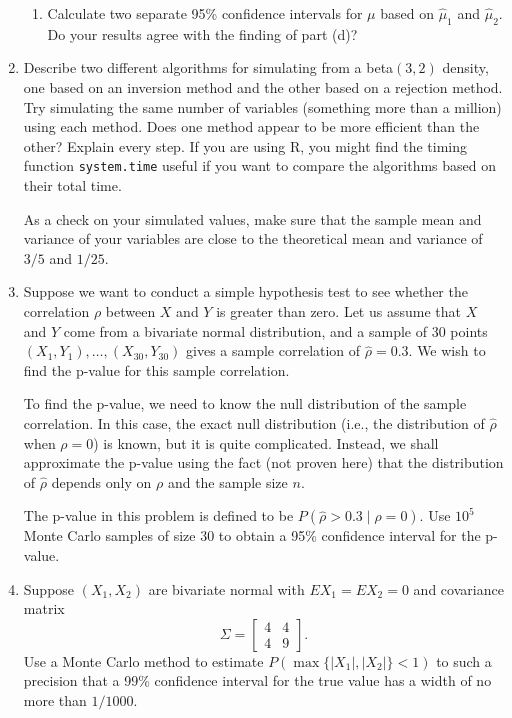 \documentclass{article}
\begin{document}
\begin{enumerate}
\begin{enumerate}
    \item Calculate two separate 95\% confidence intervals for $\mu$ based on
    $\hat\mu_1$ and $\hat\mu_2$. Do your results agree with the finding of part
    (d)?

    \end{enumerate}
    
  \item Describe two different algorithms for simulating from a beta$(3,2)$
  density, one based on an inversion method and the other based on a rejection
  method. Try simulating the same number of variables (something more than a
  million) using each method. Does one method appear to be more efficient than
  the other? Explain every step. If you are using R, you might find the timing
  function {\tt system.time} useful if you want to compare the algorithms based
  on their total time.
  
  As a check on your simulated values, make sure that the sample mean and
  variance of your variables are close to the theoretical mean and variance of
  $3/5$ and $1/25$.
  
  \item Suppose we want to conduct a simple hypothesis test to see whether the
  correlation $\rho$ between $X$ and $Y$ is greater than zero. Let us assume
  that $X$ and $Y$ come from a bivariate normal distribution, and a sample of 30
  points $(X_1, Y_1), \ldots, (X_{30}, Y_{30})$ gives a sample correlation of
  $\hat\rho=0.3$. We wish to find the p-value for this sample correlation.
  
  To find the p-value, we need to know the null distribution of the sample
  correlation. In this case, the exact null distribution (i.e., the distribution
  of $\hat\rho$ when $\rho=0$) is known, but it is quite complicated. Instead,
  we shall approximate the p-value using the fact (not proven here) that the
  distribution of $\hat\rho$ depends only on $\rho$ and the sample size $n$.

  The p-value in this problem is defined to be $P(\hat\rho>0.3 \mid \rho=0)$.
  Use $10^5$ Monte Carlo samples of size $30$ to obtain a 95\% confidence
  interval for the p-value.
  
  \item Suppose $(X_1, X_2)$ are bivariate normal with $E X_1=E X_2=0$ and
  covariance matrix 
  \[
  \Sigma = \begin{bmatrix}
  4 & 4 \\ 4 & 9
  \end{bmatrix}.
  \]
  Use a Monte Carlo method to estimate $P(\max\{ |X_1|, |X_2|\} <1)$ to such a
  precision that a 99\%
  confidence interval for the true value has a width of no more than $1/1000$.
  
\end{enumerate}
\end{document}
